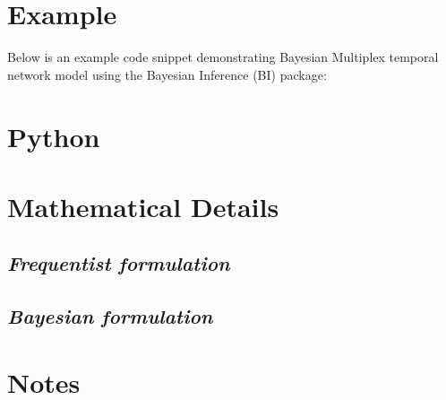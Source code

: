 \documentclass[
  letterpaper,
  DIV=11,
  numbers=noendperiod]{scrreprt}
\newenvironment{Shaded}{\begin{snugshade}}{\end{snugshade}}
\begin{document}
\section{Example}\label{example-21}

Below is an example code snippet demonstrating Bayesian Multiplex
temporal network model using the Bayesian Inference (BI) package:

\section{Python}

\begin{Shaded}
\begin{Highlighting}[]

\end{Highlighting}
\end{Shaded}

\begin{Shaded}
\begin{Highlighting}[]

\end{Highlighting}
\end{Shaded}

\section{Mathematical Details}\label{mathematical-details-23}

\subsection{\texorpdfstring{\emph{Frequentist
formulation}}{Frequentist formulation}}\label{frequentist-formulation-12}

\subsection{\texorpdfstring{\emph{Bayesian
formulation}}{Bayesian formulation}}\label{bayesian-formulation-12}

\section{Notes}\label{notes-14}

\begin{tcolorbox}[enhanced jigsaw, toptitle=1mm, opacityback=0, titlerule=0mm, breakable, bottomrule=.15mm, colframe=quarto-callout-note-color-frame, arc=.35mm, coltitle=black, left=2mm, opacitybacktitle=0.6, leftrule=.75mm, toprule=.15mm, rightrule=.15mm, bottomtitle=1mm, colbacktitle=quarto-callout-note-color!10!white, title=\textcolor{quarto-callout-note-color}{\faInfo}\hspace{0.5em}{Note}, colback=white]

\end{tcolorbox}
\end{document}
